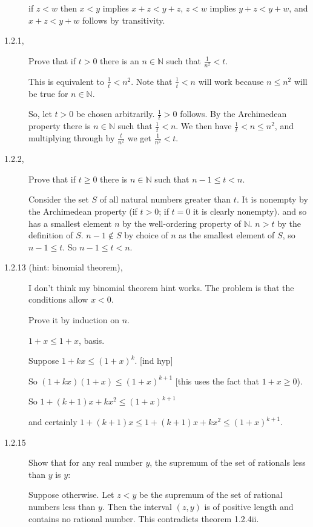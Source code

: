 \documentclass[12pt]{article}
\begin{document}
\begin{description}
if $z<w$ then $x<y$ implies $x+z<y+z$, $z<w$ implies $y+z<y+w$, and $x+z<y+w$ follows by transitivity.

\item[ 1.2.1,]  Prove that if $t>0$ there is an $n \in \mathbb N$ such that $\frac 1{n^2}<t$.

This is equivalent to $\frac 1t < n^2$.  Note that $\frac 1t < n$ will work because $n \leq n^2$ will be true for $n \in \mathbb N$.

So, let $t >0$ be chosen arbitrarily.  $\frac 1t>0$ follows.  By the Archimedean property there is $n \in \mathbb N$ such that
$\frac 1t<n$.  We then have $\frac 1t < n \leq n^2$, and multiplying through by $\frac t{n^2}$ we get $\frac 1{n^2}<t$.

\item[1.2.2,]  Prove that if $t \geq 0$ there is $n \in \mathbb N$ such that $n-1 \leq t <n$.

Consider the set $S$ of all natural numbers greater than $t$.  It is nonempty by the Archimedean property (if $t>0$; if $t=0$ it is clearly nonempty).
and so has a smallest element $n$ by the well-ordering property of $\mathbb N$.  $n>t$ by the definition of $S$.
$n-1 \not\in S$ by choice of $n$ as the smallest element of $S$, so $n-1 \leq t$.  So $n-1 \leq t  <n$.

 \item [1.2.13 (hint: binomial theorem), ]

I don't think my binomial theorem hint works.  The problem is that the conditions allow $x<0$.

Prove it by induction on $n$.

$1 + x \leq 1 + x$, basis.

Suppose $1+kx \leq (1+x)^k$. [ind hyp]

So $(1+kx)(1+x) \leq (1+x)^{k+1}$ [this uses the fact that $1+x\geq 0$).

So $1+(k+1)x + kx^2 \leq (1+x)^{k+1}$

and certainly $1+(k+1)x \leq 1+(k+1)x + kx^2 \leq (1+x)^{k+1}$.

\item[1.2.15]

Show that for any real number $y$, the supremum of the set of rationals less than $y$ is $y$:

Suppose otherwise.  Let $z<y$ be the supremum of the set of rational numbers less than $y$.  Then the interval $(z,y)$ is of positive length and contains no rational number.   This contradicts theorem 1.2.4ii.


\end{description}
\end{document}
